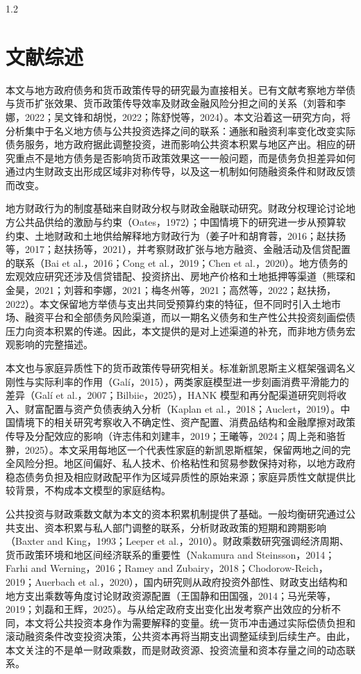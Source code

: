 \documentclass[12pt,UTF8]{ctexart}
\begin{document}
\begin{spacing}{1.2}
		\section{文献综述}
		
		本文与地方政府债务和货币政策传导的研究最为直接相关。已有文献考察地方举债与货币扩张效果、货币政策传导效率及财政金融风险分担之间的关系（刘蓉和李娜，2022；吴文锋和胡悦，2022；陈舒悦等，2024）。本文沿着这一研究方向，将分析集中于名义地方债与公共投资选择之间的联系：通胀和融资利率变化改变实际债务服务，地方政府据此调整投资，进而影响公共资本积累与地区产出。相应的研究重点不是地方债务是否影响货币政策效果这一一般问题，而是债务负担差异如何通过内生财政支出形成区域非对称传导，以及这一机制如何随融资条件和财政反馈而改变。
		
		地方财政行为的制度基础来自财政分权与财政金融联动研究。财政分权理论讨论地方公共品供给的激励与约束（Oates，1972）；中国情境下的研究进一步从预算软约束、土地财政和土地供给解释地方财政行为（姜子叶和胡育蓉，2016；赵扶扬等，2017；赵扶扬等，2021），并考察财政扩张与地方融资、金融活动及信贷配置的联系（Bai et al.，2016；Cong et al.，2019；Chen et al.，2020）。地方债务的宏观效应研究还涉及信贷错配、投资挤出、房地产价格和土地抵押等渠道（熊琛和金昊，2021；刘蓉和李娜，2021；梅冬州等，2021；高然等，2022；赵扶扬，2022）。本文保留地方举债与支出共同受预算约束的特征，但不同时引入土地市场、融资平台和全部债务风险渠道，而以一期名义债务和生产性公共投资刻画偿债压力向资本积累的传递。因此，本文提供的是对上述渠道的补充，而非地方债务宏观影响的完整描述。
		
		本文也与家庭异质性下的货币政策传导研究相关。标准新凯恩斯主义框架强调名义刚性与实际利率的作用（Galí，2015），两类家庭模型进一步刻画消费平滑能力的差异（Galí et al.，2007；Bilbiie，2025），HANK 模型和再分配渠道研究则将收入、财富配置与资产负债表纳入分析（Kaplan et al.，2018；Auclert，2019）。中国情境下的相关研究考察收入不确定性、资产配置、消费品结构和金融摩擦对政策传导及分配效应的影响（许志伟和刘建丰，2019；王曦等，2024；周上尧和骆哲翀，2025）。本文采用每地区一个代表性家庭的新凯恩斯框架，保留两地之间的完全风险分担。地区间偏好、私人技术、价格粘性和贸易参数保持对称，以地方政府稳态债务负担及相应财政配平作为区域异质性的原始来源；家庭异质性文献提供比较背景，不构成本文模型的家庭结构。
		
		公共投资与财政乘数文献为本文的资本积累机制提供了基础。一般均衡研究通过公共支出、资本积累与私人部门调整的联系，分析财政政策的短期和跨期影响（Baxter and King，1993；Leeper et al.，2010）。财政乘数研究强调经济周期、货币政策环境和地区间经济联系的重要性（Nakamura and Steinsson，2014；Farhi and Werning，2016；Ramey and Zubairy，2018；Chodorow-Reich，2019；Auerbach et al.，2020），国内研究则从政府投资外部性、财政支出结构和地方支出乘数等角度讨论财政资源配置（王国静和田国强，2014；马光荣等，2019；刘磊和王辉，2025）。与从给定政府支出变化出发考察产出效应的分析不同，本文将公共投资本身作为需要解释的变量。统一货币冲击通过实际偿债负担和滚动融资条件改变投资决策，公共资本再将当期支出调整延续到后续生产。由此，本文关注的不是单一财政乘数，而是财政资源、投资流量和资本存量之间的动态联系。
		

\end{spacing}
\end{document}
